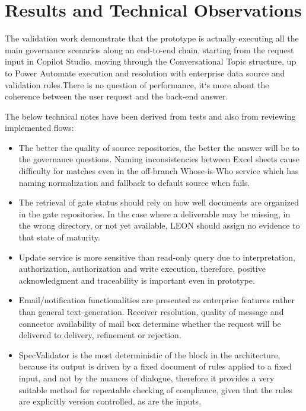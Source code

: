 \endgroup

\section{\textcolor[HTML]{0066CC}{Results and Technical Observations}}

The validation work demonstrate that the prototype is actually executing all the main governance scenarios along an end-to-end chain, starting from the request input in Copilot Studio, moving through the Conversational Topic structure, up to Power Automate execution and resolution with enterprise data source and validation rules.There is no question of performance, it‘s more about the coherence between the user request and the back-end answer.

The below technical notes have been derived from tests and also from reviewing implemented flows:

\begin{itemize}
	\item The better the quality of source repositories, the better the answer will be to the governance questions. Naming inconsistencies between Excel sheets cause difficulty for matches even in the off-branch Whose-is-Who service which has naming normalization and fallback to default source when fails.
	\item The retrieval of gate status should rely on how well documents are organized in the gate repositories. In the case where a deliverable may be missing, in the wrong directory, or not yet available, LEON should assign no evidence to that state of maturity.
	\item Update service is more sensitive than read-only query due to interpretation, authorization, authorization and write execution, therefore, positive acknowledgment and traceability is important even in prototype.
	\item Email/notification functionalities are presented as enterprise features rather than general text-generation. Receiver resolution, quality of message and connector availability of mail box determine whether the request will be delivered to delivery, refinement or rejection.
	\item SpecValidator is the most deterministic of the block in the architecture, because its output is driven by a fixed document of rules applied to a fixed input, and not by the nuances of dialogue, therefore it provides a very suitable method for repeatable checking of compliance, given that the rules are explicitly version controlled, as are the inputs.
\end{itemize}

